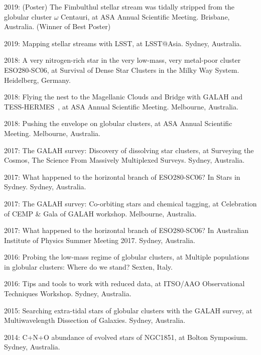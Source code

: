 \item[{\color{numcolor}\scriptsize15}] 2019: (Poster) The Fimbulthul stellar stream was tidally stripped from the globular cluster $\omega$ Centauri, at ASA Annual Scientific Meeting. Brisbane, Australia. (Winner of Best Poster)
\item[{\color{numcolor}\scriptsize15}] 2019: Mapping stellar streams with LSST, at LSST@Asia. Sydney, Australia.
\item[{\color{numcolor}\scriptsize14}] 2018: A very nitrogen-rich star in the very low-mass, very metal-poor cluster ESO280-SC06, at Survival of Dense Star Clusters in the Milky Way System. Heidelberg, Germany.
\item[{\color{numcolor}\scriptsize13}] 2018: Flying the nest to the Magellanic Clouds and Bridge with GALAH and TESS-HERMES~, at ASA Annual Scientific Meeting. Melbourne, Australia.
\item[{\color{numcolor}\scriptsize12}] 2018: Pushing the envelope on globular clusters, at  ASA Annual Scientific Meeting. Melbourne, Australia.
\item[{\color{numcolor}\scriptsize11}] 2017: The GALAH survey: Discovery of dissolving star clusters, at  Surveying the Cosmos, The Science From Massively Multiplexed Surveys. Sydney, Australia.
\item[{\color{numcolor}\scriptsize10}] 2017: What happened to the horizontal branch of ESO280-SC06? In Stars in Sydney. Sydney, Australia.
\item[{\color{numcolor}\scriptsize9}] 2017: The GALAH survey: Co-orbiting stars and chemical tagging, at  Celebration of CEMP \& Gala of GALAH workshop. Melbourne, Australia.
\item[{\color{numcolor}\scriptsize8}] 2017: What happened to the horizontal branch of ESO280-SC06? In Australian Institute of Physics Summer Meeting 2017. Sydney, Australia.
\item[{\color{numcolor}\scriptsize7}] 2016: Probing the low-mass regime of globular clusters, at  Multiple populations in globular clusters: Where do we stand? Sexten, Italy.
\item[{\color{numcolor}\scriptsize6}] 2016: Tips and tools to work with reduced data, at  ITSO/AAO Observational Techniques Workshop. Sydney, Australia.
\item[{\color{numcolor}\scriptsize5}] 2015: Searching extra-tidal stars of globular clusters with the GALAH survey, at  Multiwavelength Dissection of Galaxies. Sydney, Australia.
\item[{\color{numcolor}\scriptsize4}] 2014: C+N+O abundance of evolved stars of NGC1851, at  Bolton Symposium. Sydney, Australia.
